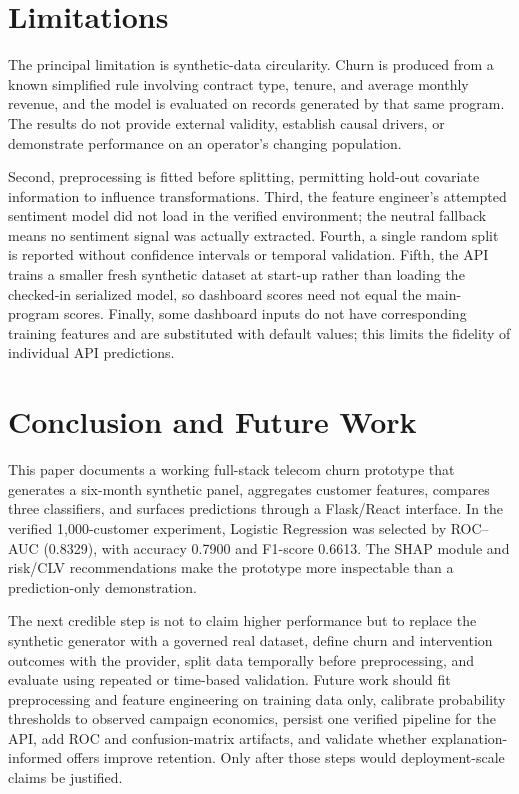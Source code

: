 \documentclass[conference]{IEEEtran}
\begin{document}
\section{Limitations}
The principal limitation is synthetic-data circularity. Churn is produced from a known simplified rule involving contract type, tenure, and average monthly revenue, and the model is evaluated on records generated by that same program. The results do not provide external validity, establish causal drivers, or demonstrate performance on an operator's changing population.

Second, preprocessing is fitted before splitting, permitting hold-out covariate information to influence transformations. Third, the feature engineer's attempted sentiment model did not load in the verified environment; the neutral fallback means no sentiment signal was actually extracted. Fourth, a single random split is reported without confidence intervals or temporal validation. Fifth, the API trains a smaller fresh synthetic dataset at start-up rather than loading the checked-in serialized model, so dashboard scores need not equal the main-program scores. Finally, some dashboard inputs do not have corresponding training features and are substituted with default values; this limits the fidelity of individual API predictions.

\section{Conclusion and Future Work}
This paper documents a working full-stack telecom churn prototype that generates a six-month synthetic panel, aggregates customer features, compares three classifiers, and surfaces predictions through a Flask/React interface. In the verified 1,000-customer experiment, Logistic Regression was selected by ROC--AUC (0.8329), with accuracy 0.7900 and F1-score 0.6613. The SHAP module and risk/CLV recommendations make the prototype more inspectable than a prediction-only demonstration.

The next credible step is not to claim higher performance but to replace the synthetic generator with a governed real dataset, define churn and intervention outcomes with the provider, split data temporally before preprocessing, and evaluate using repeated or time-based validation. Future work should fit preprocessing and feature engineering on training data only, calibrate probability thresholds to observed campaign economics, persist one verified pipeline for the API, add ROC and confusion-matrix artifacts, and validate whether explanation-informed offers improve retention. Only after those steps would deployment-scale claims be justified.
\end{document}
